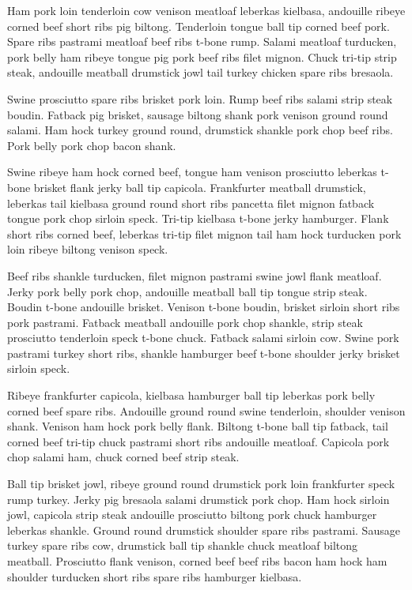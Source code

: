 Ham pork loin tenderloin cow venison meatloaf leberkas kielbasa, andouille ribeye corned beef short ribs pig biltong. Tenderloin tongue ball tip corned beef pork. Spare ribs pastrami meatloaf beef ribs t-bone rump. Salami meatloaf turducken, pork belly ham ribeye tongue pig pork beef ribs filet mignon. Chuck tri-tip strip steak, andouille meatball drumstick jowl tail turkey chicken spare ribs bresaola.

Swine prosciutto spare ribs brisket pork loin. Rump beef ribs salami strip steak boudin. Fatback pig brisket, sausage biltong shank pork venison ground round salami. Ham hock turkey ground round, drumstick shankle pork chop beef ribs. Pork belly pork chop bacon shank.

Swine ribeye ham hock corned beef, tongue ham venison prosciutto leberkas t-bone brisket flank jerky ball tip capicola. Frankfurter meatball drumstick, leberkas tail kielbasa ground round short ribs pancetta filet mignon fatback tongue pork chop sirloin speck. Tri-tip kielbasa t-bone jerky hamburger. Flank short ribs corned beef, leberkas tri-tip filet mignon tail ham hock turducken pork loin ribeye biltong venison speck.

Beef ribs shankle turducken, filet mignon pastrami swine jowl flank meatloaf. Jerky pork belly pork chop, andouille meatball ball tip tongue strip steak. Boudin t-bone andouille brisket. Venison t-bone boudin, brisket sirloin short ribs pork pastrami. Fatback meatball andouille pork chop shankle, strip steak prosciutto tenderloin speck t-bone chuck. Fatback salami sirloin cow. Swine pork pastrami turkey short ribs, shankle hamburger beef t-bone shoulder jerky brisket sirloin speck.

Ribeye frankfurter capicola, kielbasa hamburger ball tip leberkas pork belly corned beef spare ribs. Andouille ground round swine tenderloin, shoulder venison shank. Venison ham hock pork belly flank. Biltong t-bone ball tip fatback, tail corned beef tri-tip chuck pastrami short ribs andouille meatloaf. Capicola pork chop salami ham, chuck corned beef strip steak.

Ball tip brisket jowl, ribeye ground round drumstick pork loin frankfurter speck rump turkey. Jerky pig bresaola salami drumstick pork chop. Ham hock sirloin jowl, capicola strip steak andouille prosciutto biltong pork chuck hamburger leberkas shankle. Ground round drumstick shoulder spare ribs pastrami. Sausage turkey spare ribs cow, drumstick ball tip shankle chuck meatloaf biltong meatball. Prosciutto flank venison, corned beef beef ribs bacon ham hock ham shoulder turducken short ribs spare ribs hamburger kielbasa.

